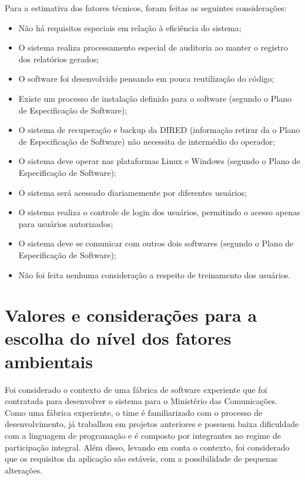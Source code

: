       Para a estimativa dos fatores técnicos, foram feitas as seguintes considerações:
    
      \begin{itemize}
       \item Não há requisitos especiais em relação à eficiência do sistema;
       \item O sistema realiza processamento especial de auditoria ao manter o registro dos relatórios gerados;
       \item O software foi desenvolvido pensando em pouca reutilização do código;
       \item Existe um processo de instalação definido para o software (segundo o Plano de Especificação de Software);
       \item O sistema de recuperação e backup da DIRED (informação retirar da o Plano de Especificação de Software)
	  não necessita de intermédio do operador;
       \item O sistema deve operar nas plataformas Linux e Windows (segundo o Plano de Especificação de Software);
       \item O sistema será acessado diariamemente por diferentes usuários;
       \item O sistema realiza o controle de login dos usuários, permitindo o acesso apenas para usuários autorizados;
       \item O sistema deve se comunicar com outros dois softwares (segundo o Plano de Especificação de Software);
       \item Não foi feita nenhuma consideração a respeito de treinamento dos usuários.
      \end{itemize}

  
\section{Valores e considerações para a escolha do nível dos fatores ambientais}
    
    Foi considerado o contexto de uma fábrica de software experiente que foi contratada para desenvolver o sistema 
    para o Ministério das Comunicações. Como uma fábrica experiente, o time é familiarizado com o processo de desenvolvimento, 
    já trabalhou em projetos anteriores e possuem baixa dificuldade com a linguagem de programação e é composto por integrantes no regime de 
    participação integral.
    Além disso, levando em conta o contexto,
    foi considerado que os requisitos da aplicação são estáveis, com a possibilidade de pequenas alterações.
    
